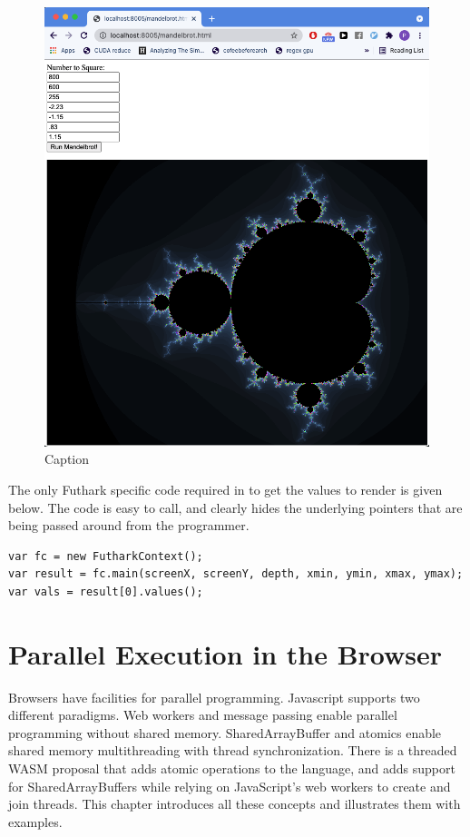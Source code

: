 \documentclass[11pt]{book}
\begin{document}
\begin{figure}[htbp]
    \centering
    \includegraphics[scale=0.2]{figures/mandelbrot.png}
    \caption{Caption}
    \label{fig:mandelbrot}
\end{figure}

The only Futhark specific code required in to get the values to render is given below. The code is easy to call, and clearly hides the underlying pointers that are being passed around from the programmer.

\begin{verbatim}
var fc = new FutharkContext();
var result = fc.main(screenX, screenY, depth, xmin, ymin, xmax, ymax);
var vals = result[0].values();
\end{verbatim}


\chapter{Parallel Execution in the Browser}


Browsers have facilities for parallel programming. Javascript supports two different paradigms. Web workers and message passing enable parallel programming without shared memory. SharedArrayBuffer and atomics enable shared memory multithreading with thread synchronization. There is a threaded WASM proposal that adds atomic operations to the language, and adds support for SharedArrayBuffers while relying on JavaScript's web workers to create and join threads. This chapter introduces all these concepts and illustrates them with examples.
\end{document}
